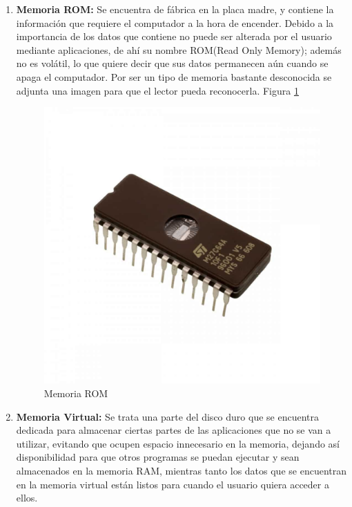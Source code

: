 \documentclass{article}
\begin{document}
\begin{enumerate}
\item \textbf{Memoria ROM:} Se encuentra de fábrica en la placa madre, y contiene la información que requiere el computador a la hora de encender. Debido a la importancia de los datos que contiene no puede ser alterada por el usuario mediante aplicaciones, de ahí su nombre ROM(Read Only Memory); además no es volátil, lo que quiere decir que sus datos permanecen aún cuando se apaga el computador. \cite{tecnologia-informatica} Por ser un tipo de memoria bastante desconocida se adjunta una imagen para que el lector pueda reconocerla. Figura \ref{fig:memoria_rom}
    \begin{figure}[h]
        \centering
        \includegraphics[scale=0.15]{Memoria ROM.jpg}
        \caption{Memoria ROM}
        \label{fig:memoria_rom}
    \end{figure}

\item \textbf{Memoria Virtual:} Se trata una parte del disco duro que se encuentra dedicada para almacenar ciertas partes de las aplicaciones que no se van a utilizar, evitando que ocupen espacio innecesario en la memoria, dejando así disponibilidad para que otros programas se puedan ejecutar y sean almacenados en la memoria RAM, mientras tanto los datos que se encuentran en la memoria virtual están listos para cuando el usuario quiera acceder a ellos.


\end{enumerate}
\end{document}
